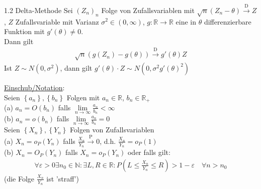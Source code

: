 \documentclass[a4paper,openany]{book}
\theoremstyle{mytheoremstyle}
\theoremstyle{mytheoremstyle2}
\begin{document}
\begin{theo}{1.2 Delta-Methode}{}
  Sei $(Z_n)_n$ Folge von Zufallsvariablen mit $\sqrt{n}(Z_n-\theta)\overset{\text{D}}\to Z$, $Z$ Zufallsvariable mit Varianz $\sigma ^2 \in (0,\infty )$, $g:\mathbb{R}\to \mathbb{R}$ eine in $\theta$ differenzierbare Funktion mit $g'(\theta)\neq 0$. \\
  Dann gilt 
  \begin{align*}
    \sqrt{n}(g(Z_n)-g(\theta))\overset{\text{D}}\to g'(\theta)Z
  \end{align*}
  Ist $Z\sim N(0,\sigma ^2)$, dann gilt $g'(\theta)\cdot Z\sim N(0,\sigma ^2 g'(\theta)^2)$ 
\end{theo}
\noindent\underline{Einschub/Notation}:\\
Seien $\left\{a_n\right\},\left\{b_n\right\}$ Folgen mit $a_n \in \mathbb{R}$, $b_n \in \mathbb{R}_+$ \\
(a) $a_n=O(b_n)$ falls $\lim\limits_{n\to \infty }\frac{a_n}{b_n}<\infty $  \\
(b) $a_n=o(b_n)$ falls $\lim\limits_{n\to \infty }\frac{a_n}{b_n}=0 $ \\
Seien $\left\{X_n\right\},\left\{Y_n\right\}$ Folgen von Zufallsvariablen \\
(a) $X_n=o_P(Y_n)$ falls $\frac{X_n}{Y_n}\overset{\text{P}}\to 0$, d.h. $\frac{X_n}{Y_n}=o_P(1)$ \\
(b) $X_n=O_P(Y_n)$ falls $X_n=o_P(Y_n)$ oder falls gilt:
\begin{align*}
  \forall \varepsilon >0 \exists n_0 \in \mathbb{N}:\exists L,R \in \mathbb{R}:P \left(L \leq \frac{X_n}{Y_n}\leq R\right) >1-\varepsilon \quad \forall n>n_0
\end{align*}
  (die Folge $\frac{X_n}{Y_n}$ ist 'straff')
\end{document}
